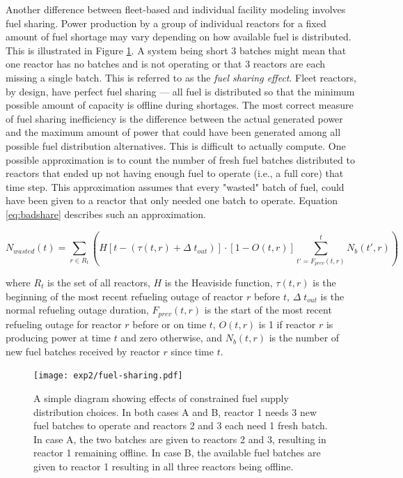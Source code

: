 \documentclass{style}
\begin{document}
Another difference between fleet-based and individual facility modeling
involves fuel sharing.  Power production by a group of individual reactors for
a fixed amount of fuel shortage may vary depending on how available fuel is
distributed.  This is illustrated in Figure \ref{fig:fuel-sharing}.  A system
being short 3 batches might mean that one reactor has no batches and is not
operating or that 3 reactors are each missing a single batch.  This is
referred to as the \emph{fuel sharing effect}.  Fleet reactors, by design,
have perfect fuel sharing --- all fuel is distributed so that the minimum
possible amount of capacity is offline during shortages.  The most correct
measure of fuel sharing inefficiency is the difference between the actual
generated power and the maximum amount of power that could have been generated
among all possible fuel distribution alternatives.  This is difficult to
actually compute. One possible approximation is to count the number of fresh
fuel batches distributed to reactors that ended up not having enough fuel to
operate (i.e., a full core) that time step.  This approximation assumes that
every "wasted" batch of fuel, could have been given to a reactor that only
needed one batch to operate.  Equation \ref{eq:badshare} describes such an
approximation.

\begin{equation}
    N_{wasted}(t) = \sum\limits_{r \in R_t} \left(H[t-(\tau(t,r) + \Delta\;t_{out})] \cdot [1-O(t,r)]  \sum\limits_{t'=F_{prev}(t,r)}^{t} N_b(t',r) \right)
    \label{eq:badshare}
\end{equation}

\noindent
where $R_t$ is the set of all reactors, $H$ is the Heaviside function,
$\tau(t,r)$ is the beginning of the most recent refueling outage of reactor $r$ before $t$,
$\Delta\; t_{out}$ is the normal refueling outage duration, $F_{prev}(t,r)$ is
the start of the most recent refueling outage for reactor $r$ before or on
time $t$, $O(t,r)$ is 1 if reactor $r$ is producing power at time $t$ and zero
otherwise, and $N_b(t,r)$ is the number of new fuel batches received by
reactor $r$ since time $t$.

\begin{figure}[h]
    \centering
    \texttt{[image: exp2/fuel-sharing.pdf]}
    \caption[The fuel sharing effect]{
        A simple diagram showing effects of constrained fuel supply
        distribution choices. In both cases A and B, reactor 1 needs 3 new
        fuel batches to operate and reactors 2 and 3 each need 1 fresh batch.
        In case A, the two batches are given to reactors 2 and 3, resulting in
        reactor 1 remaining offline. In case B, the available fuel batches are
        given to reactor 1 resulting in all three reactors being offline.
    }
    \label{fig:fuel-sharing}
\end{figure}
\end{document}
